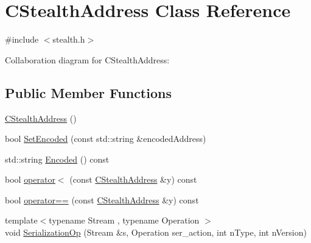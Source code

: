 \hypertarget{class_c_stealth_address}{}\section{C\+Stealth\+Address Class Reference}
\label{class_c_stealth_address}


{\ttfamily \#include $<$stealth.\+h$>$}



Collaboration diagram for C\+Stealth\+Address\+:
\subsection*{Public Member Functions}
\begin{DoxyCompactItemize}
\item 
\hyperlink{class_c_stealth_address_adbc121fd61e98fd17a395b1dd081561a}{C\+Stealth\+Address} ()
\item 
bool \hyperlink{class_c_stealth_address_aa3f4655dced125bf698c208b6e7ac4b8}{Set\+Encoded} (const std\+::string \&encoded\+Address)
\item 
std\+::string \hyperlink{class_c_stealth_address_a7d331c1fb6e9479b31d35a50c4bb0f0c}{Encoded} () const 
\item 
bool \hyperlink{class_c_stealth_address_ab4eb491546beb4e7b16ef871d90eec2e}{operator$<$} (const \hyperlink{class_c_stealth_address}{C\+Stealth\+Address} \&y) const 
\item 
bool \hyperlink{class_c_stealth_address_a12d95d589b15a49eb4654400e0b67e46}{operator==} (const \hyperlink{class_c_stealth_address}{C\+Stealth\+Address} \&y) const 
\item 
{\footnotesize template$<$typename Stream , typename Operation $>$ }\\void \hyperlink{class_c_stealth_address_aa69f3712f4f7fdd8a4644223b5b7690a}{Serialization\+Op} (Stream \&s, Operation ser\+\_\+action, int n\+Type, int n\+Version)
\end{DoxyCompactItemize}
